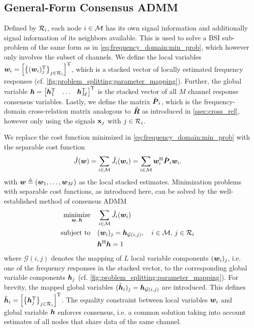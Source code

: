 \documentclass{article}
\begin{document}
\subsection{General-Form Consensus ADMM}
\label{ssec:general_consensus_admm}
Defined by \(\mathcal{R}_i\), each node \(i \in \mathcal{M}\) has its own signal information and additionally signal information of its neighbors available.
This is used to solve a BSI sub-problem of the same form as in \eqref{eq:frequency_domain:min_prob}, which however only involves the subset of channels.
We define the local variables \({\bm{w}}_i = \left[ \left\{ ({\bm{w}}_i)_j^{\mathrm{T}} \right\}_{j \in \mathcal{R}_i} \right]^{\mathrm{T}}\), which is a stacked vector of locally estimated frequency responses (cf. \autoref{fig:problem_splitting:parameter_mapping}).
Further, the global variable \({\bm{h}} = \begin{bmatrix}
    {\bm{h}}_1^{\mathrm{T}} & \ldots & {\bm{h}}_M^{\mathrm{T}}
\end{bmatrix}^{\mathrm{T}}\) is the stacked vector of all \(M\) channel response consensus variables.
Lastly, we define the matrix \(\hat{{\bm{{P}}}}_i\), which is the frequency-domain cross-relation matrix analogous to \(\hat{{\bm{{R}}}}\) as introduced in \autoref{ssec:cross_rel}, however only using the signals \(\bm{\mathrm{x}}_j\) with \(j \in \mathcal{R}_i\).

We replace the cost function minimized in \eqref{eq:frequency_domain:min_prob} with the separable cost function 
\begin{equation}
    \tilde{J}({\bm{w}}) = \sum_{i \in \mathcal{M}} \tilde{J}_i({\bm{w}}_i)  = \sum_{i \in \mathcal{M}} {\bm{w}}_i^{\mathrm{H}} \hat{{\bm{{P}}}}_i {\bm{w}}_i.
    \label{eq:problem_splitting:cost_function}
\end{equation}
with \({\bm{w}} \triangleq ({\bm{w}}_1,\ldots,{\bm{w}}_M)\) as the local stacked estimates.
Minimization problems with separable cost functions, as introduced here, can be solved by the well-established method of consensus ADMM \cite{boydDistributedOptimizationStatistical2011}
\begin{align}
    \underset{{\bm{w}},\,{\bm{h}}}{\operatorname{minimize}} \quad &\sum_{i \in \mathcal{M}} \tilde{J}_i({\bm{w}}_i)\label{eq:general_consensus_admm:min_prob}\\
    \text{subject to} \quad &({\bm{w}}_i)_j = {\bm{h}}_{\mathcal{G}(i,j)},\quad i \in \mathcal{M},\,j \in \mathcal{R}_i\label{eq:general_consensus_admm:eq_constraint}\\
    &{\bm{h}}^{\mathrm{H}} {\bm{h}} = 1\label{eq:general_consensus_admm:norm_constraint}
\end{align}
where \(\mathcal{G}(i,j)\) denotes the mapping of \(L\) local variable components \(({\bm{w}}_i)_j\), i.e. one of the frequency responses in the stacked vector, to the corresponding global variable components \({\bm{h}}_j\) (cf. \autoref{fig:problem_splitting:parameter_mapping}).
For brevity, the mapped global variables \((\tilde{{\bm{h}}}_i)_j = {\bm{h}}_{\mathcal{G}(i,j)}\) are introduced.
This defines \(\tilde{{\bm{h}}}_i = \left[ \left\{ {\bm{h}}_j^{\mathrm{T}} \right\}_{j \in \mathcal{R}_i} \right]^{\mathrm{T}}\).
The equality constraint between local variables \({\bm{w}}_i\) and global variable \({\bm{h}}\) enforces consensus, i.e. a common solution taking into account estimates of all nodes that share data of the same channel.
\end{document}
